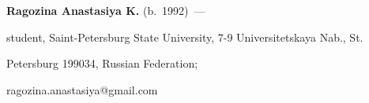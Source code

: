 \vspace*{3pt}





\noindent


\textbf{Ragozina Anastasiya K.} (b.\ 1992)~---


student, Saint-Petersburg State University, 7-9 Universitetskaya Nab., St.\


Petersburg 199034, Russian Federation;


\mbox{ragozina.anastasiya@gmail.com}





 \label{end\stat}








\renewcommand{\bibname}{\protect\rm Литература} 